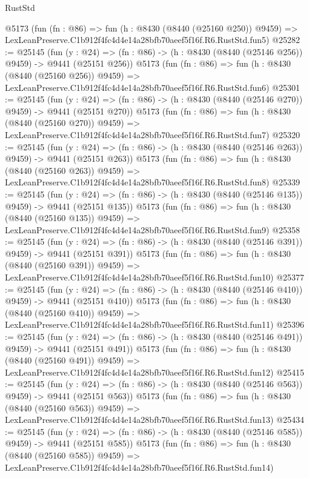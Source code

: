 \begin{lexlean}{RustStd}
\begin{coremodule}
    @5173
    (fun (fn : @86) =>
    fun (h : @8430 (@8440 (@25160 @250)) @9459) =>
    LexLeanPreserve.C1b912f4fc4d4e14a28bfb70aeef5f16f.R6.RustStd.fun5)
@25282 := @25145
    (fun (y : @24) => (fn : @86) -> (h : @8430 (@8440 (@25146 @256)) @9459) -> @9441 (@25151 @256))
    @5173
    (fun (fn : @86) =>
    fun (h : @8430 (@8440 (@25160 @256)) @9459) =>
    LexLeanPreserve.C1b912f4fc4d4e14a28bfb70aeef5f16f.R6.RustStd.fun6)
@25301 := @25145
    (fun (y : @24) => (fn : @86) -> (h : @8430 (@8440 (@25146 @270)) @9459) -> @9441 (@25151 @270))
    @5173
    (fun (fn : @86) =>
    fun (h : @8430 (@8440 (@25160 @270)) @9459) =>
    LexLeanPreserve.C1b912f4fc4d4e14a28bfb70aeef5f16f.R6.RustStd.fun7)
@25320 := @25145
    (fun (y : @24) => (fn : @86) -> (h : @8430 (@8440 (@25146 @263)) @9459) -> @9441 (@25151 @263))
    @5173
    (fun (fn : @86) =>
    fun (h : @8430 (@8440 (@25160 @263)) @9459) =>
    LexLeanPreserve.C1b912f4fc4d4e14a28bfb70aeef5f16f.R6.RustStd.fun8)
@25339 := @25145
    (fun (y : @24) => (fn : @86) -> (h : @8430 (@8440 (@25146 @135)) @9459) -> @9441 (@25151 @135))
    @5173
    (fun (fn : @86) =>
    fun (h : @8430 (@8440 (@25160 @135)) @9459) =>
    LexLeanPreserve.C1b912f4fc4d4e14a28bfb70aeef5f16f.R6.RustStd.fun9)
@25358 := @25145
    (fun (y : @24) => (fn : @86) -> (h : @8430 (@8440 (@25146 @391)) @9459) -> @9441 (@25151 @391))
    @5173
    (fun (fn : @86) =>
    fun (h : @8430 (@8440 (@25160 @391)) @9459) =>
    LexLeanPreserve.C1b912f4fc4d4e14a28bfb70aeef5f16f.R6.RustStd.fun10)
@25377 := @25145
    (fun (y : @24) => (fn : @86) -> (h : @8430 (@8440 (@25146 @410)) @9459) -> @9441 (@25151 @410))
    @5173
    (fun (fn : @86) =>
    fun (h : @8430 (@8440 (@25160 @410)) @9459) =>
    LexLeanPreserve.C1b912f4fc4d4e14a28bfb70aeef5f16f.R6.RustStd.fun11)
@25396 := @25145
    (fun (y : @24) => (fn : @86) -> (h : @8430 (@8440 (@25146 @491)) @9459) -> @9441 (@25151 @491))
    @5173
    (fun (fn : @86) =>
    fun (h : @8430 (@8440 (@25160 @491)) @9459) =>
    LexLeanPreserve.C1b912f4fc4d4e14a28bfb70aeef5f16f.R6.RustStd.fun12)
@25415 := @25145
    (fun (y : @24) => (fn : @86) -> (h : @8430 (@8440 (@25146 @563)) @9459) -> @9441 (@25151 @563))
    @5173
    (fun (fn : @86) =>
    fun (h : @8430 (@8440 (@25160 @563)) @9459) =>
    LexLeanPreserve.C1b912f4fc4d4e14a28bfb70aeef5f16f.R6.RustStd.fun13)
@25434 := @25145
    (fun (y : @24) => (fn : @86) -> (h : @8430 (@8440 (@25146 @585)) @9459) -> @9441 (@25151 @585))
    @5173
    (fun (fn : @86) =>
    fun (h : @8430 (@8440 (@25160 @585)) @9459) =>
    LexLeanPreserve.C1b912f4fc4d4e14a28bfb70aeef5f16f.R6.RustStd.fun14)

\end{coremodule}
\end{lexlean}
